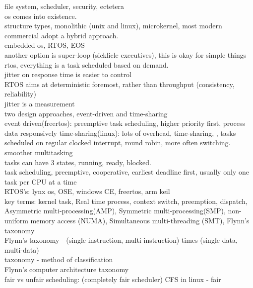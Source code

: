 \documentclass{article}
\begin{document}
file system, scheduler, security, ectetera\\

os comes into existence.\\

structure types, monolithic (unix and linux), microkernel, most modern commercial adopt a hybrid approach.\\

embedded os, RTOS, EOS\\
another option is super-loop (sicklicle executives), this is okay for simple things\\
rtos, everything is a task scheduled based on demand.\\
jitter on response time is easier to control\\

RTOS aims at deterministic foremost, rather than throughput (consistency, reliability)\\
jitter is a measurement\\

two design approaches, event-driven and time-sharing\\
event driven(freertos): preemptive task scheduling, higher priority first, process data responsively
time-sharing(linux): lots of overhead, time-sharing, , tasks scheduled on regular clocked interrupt, round robin, more often switching. smoother multitasking\\

tasks can have 3 states, running, ready, blocked.\\
task scheduling, preemptive, cooperative, earliest deadline first, usually only one task per CPU at a time\\

RTOS's: lynx os, OSE, windows CE, freertos, arm keil\\

key terms: kernel task, Real time process, context switch, preemption, dispatch, Asymmetric multi-processing(AMP), Symmetric multi-processing(SMP), non-uniform memory access (NUMA), Simultaneous multi-threading (SMT), Flynn's taxonomy\\

Flynn's taxonomy - (single instruction, multi instruction) times (single data, multi-data)\\

taxonomy - method of classification\\

Flynn's computer architecture taxonomy\\

fair vs unfair scheduling: (completely fair scheduler) CFS in linux - fair\\
\end{document}
